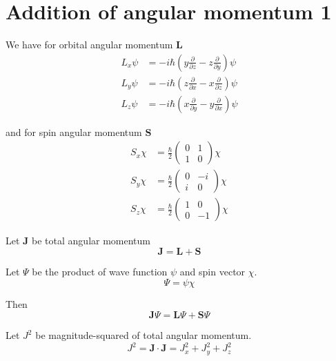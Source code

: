 

\section*{Addition of angular momentum 1}

We have for orbital angular momentum $\mathbf L$
\begin{align*}
L_x\psi&=-i\hbar\left(y\frac{\partial}{\partial z}-z\frac{\partial}{\partial y}\right)\psi
\\[1ex]
L_y\psi&=-i\hbar\left(z\frac{\partial}{\partial x}-x\frac{\partial}{\partial z}\right)\psi
\\[1ex]
L_z\psi&=-i\hbar\left(x\frac{\partial}{\partial y}-y\frac{\partial}{\partial x}\right)\psi
\end{align*}

and for spin angular momentum $\mathbf S$
\begin{align*}
S_x\chi&=\frac{\hbar}{2}\begin{pmatrix}0&1\\1&0\end{pmatrix}\chi
\\[1ex]
S_y\chi&=\frac{\hbar}{2}\begin{pmatrix}0&-i\\i&0\end{pmatrix}\chi
\\[1ex]
S_z\chi&=\frac{\hbar}{2}\begin{pmatrix}1&0\\0&-1\end{pmatrix}\chi
\end{align*}

Let $\mathbf J$ be total angular momentum
\begin{equation*}
\mathbf J=\mathbf L+\mathbf S
\end{equation*}

Let $\Psi$ be the product of wave function $\psi$ and spin vector $\chi$.
\begin{equation*}
\Psi=\psi\chi
\end{equation*}

Then
\begin{equation*}
\mathbf J\Psi=\mathbf L\Psi+\mathbf S\Psi
\end{equation*}

Let $J^2$ be magnitude-squared of total angular momentum.
\begin{equation*}
J^2=\mathbf J\cdot\mathbf J=J_x^2+J_y^2+J_z^2
\end{equation*}

